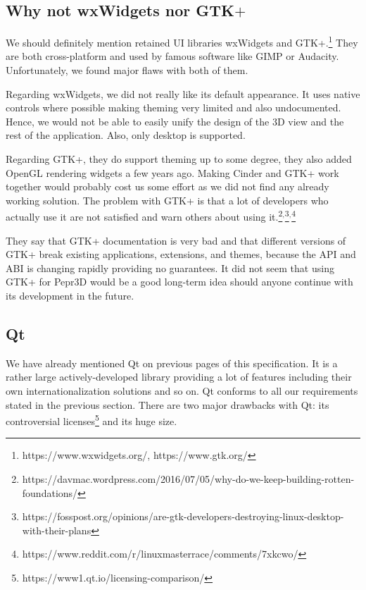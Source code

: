 \subsection{Why not wxWidgets nor GTK$+$}

We should definitely mention retained UI libraries wxWidgets and GTK+.\footnote{https://www.wxwidgets.org/, https://www.gtk.org/}
They are both cross-platform and used by famous software like GIMP or Audacity.
Unfortunately, we found major flaws with both of them.

Regarding wxWidgets, we did not really like its default appearance.
It uses native controls where possible making theming very limited and also undocumented.
Hence, we would not be able to easily unify the design of the 3D view and the rest of the application.
Also, only desktop is supported.

Regarding GTK+, they do support theming up to some degree, they also added OpenGL rendering widgets a few years ago.
Making Cinder and GTK+ work together would probably cost us some effort as we did not find any already working solution.
The problem with GTK+ is that a lot of developers who actually use it are not satisfied and warn others about using it.\footnote{https://davmac.wordpress.com/2016/07/05/why-do-we-keep-building-rotten-foundations/}$^{,}$\footnote{https://fosspost.org/opinions/are-gtk-developers-destroying-linux-desktop-with-their-plans}$^{,}$\footnote{https://www.reddit.com/r/linuxmasterrace/comments/7xkcwo/}

They say that GTK+ documentation is very bad and that different versions of GTK+ break existing applications, extensions, and themes, because the API and ABI is changing rapidly providing no guarantees.
It did not seem that using GTK+ for Pepr3D would be a good long-term idea should anyone continue with its development in the future.

\subsection{Qt}

We have already mentioned Qt on previous pages of this specification.
It is a rather large actively-developed library providing a lot of features including their own internationalization solutions and so on.
Qt conforms to all our requirements stated in the previous section.
There are two major drawbacks with Qt: its controversial licenses\footnote{https://www1.qt.io/licensing-comparison/} and its huge size.

